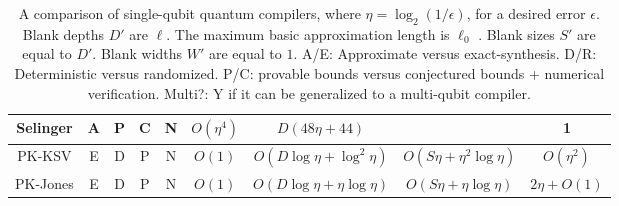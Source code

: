 \begin{landscape}
\begin{table}[hbt!]
\begin{center}
\begin{tabular}{|c|c|c|c|c|c|c|c|c|}
Selinger\cite{Selinger2012} & A   & P   & C  & N    & $O(\eta^4)$                          & $D(48\eta + 44)$           &                       & 1    \\
\hline
PK-KSV \cite{Kitaev2002,Cleve2000} & E & D & P & N  & $O(1)$                            & $O(D\log \eta + \log^2 \eta)$ & $O(S \eta + \eta^2 \log \eta)$ & $O(\eta^2)$ \\
PK-Jones \cite{Jones2013}   & E  & D    & P  & N     & $O(1)$                           & $O(D\log \eta + \eta \log \eta)$ & $O(S \eta + \eta \log \eta)$   & $2\eta + O(1)$ \\
\hline
\end{tabular}
\caption[A comparison of single-qubit quantum compilers]{A comparison of single-qubit quantum compilers, where $\eta = \log_2(1/\epsilon)$, for a desired error $\epsilon$.
Blank depths $D'$ are $\ell$. The maximum basic approximation length is $\ell_0$ \cite{Dawson2005}. Blank sizes $S'$ are equal to $D'$. Blank widths $W'$ are equal to $1$.
A/E: Approximate versus exact-synthesis. D/R: Deterministic versus randomized. P/C: provable bounds versus conjectured bounds + numerical verification.
Multi?: Y if it can be generalized to a multi-qubit compiler.}
\label{tab:qcompile-compare}
\end{center}
\end{table}

\end{landscape}

